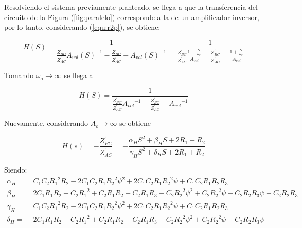 Resolviendo el sistema previamente planteado, se llega a que la transferencia del circuito de la Figura (\ref{fig:paralelo}) corresponde a la de un amplificador inversor, por lo tanto, considerando (\ref{equ:r2p}), se obtiene:

\begin{equation*}
	H(S) = \frac{1}{\frac{Z_{BC}^{'}}{Z_{AC}^{'}} {A_{vol}\left(S\right)}^{-1} - \frac{Z_{BC}^{'}}{Z_{AC}^{'}} - {A_{vol}\left(S\right)}^{-1}} = \frac{1}{\frac{Z_{BC}^{'}}{Z_{AC}^{'}} \frac{1 + \frac{S}{\omega_o}}{A_{vol}} - \frac{Z_{BC}^{'}}{Z_{AC}^{'}} - \frac{1 + \frac{S}{\omega_o}}{A_{vol}}}
	\label{equ:hsavolw}
\end{equation*}

Tomando $\omega_o \rightarrow \infty$ se llega a

\begin{equation*}
	H(S) = \frac{1}{\frac{Z_{BC}^{'}}{Z_{AC}^{'}} {A_{vol}}^{-1} - \frac{Z_{BC}^{'}}{Z_{AC}^{'}} - {A_{vol}}^{-1}}
	\label{equ:hsavol}
\end{equation*}

Nuevamente, considerando $A_o \rightarrow \infty$ se obtiene

\begin{equation}
	H(s) = -\frac{Z_{BC}^{'}}{Z_{AC}^{'}} = - \frac{\alpha_H S^{2} + \beta_H S + 2 R_{1} + R_{2}}
	{\gamma_H S^{2} + \delta_H S + 2 R_{1} + R_{2}}
	\label{equ:hs}
\end{equation}

Siendo: 
\begin{equation}
\begin{split}
	\alpha_H =\ & C_{1} C_{2} {R_{1}}^{2} R_{2} - 2 C_{1} C_{2} R_{1} {R_{2}}^{2} \psi^{2} + 2 C_{1} C_{2} R_{1} {R_{2}}^{2} \psi + C_{1} C_{2} R_{1} R_{2} R_{3}\\
	\beta_H =\ & 2 C_{1} R_{1} R_{2} + C_{2} {R_{1}}^{2} + C_{2} R_{1} R_{2} + C_{2} R_{1} R_{3} - C_{2} {R_{2}}^{2} \psi^{2} + C_{2} {R_{2}}^{2} \psi - C_{2} R_{2} R_{3} \psi + C_{2} R_{2} R_{3}\\
	\gamma_H =\ & C_{1} C_{2} {R_{1}}^{2} R_{2} - 2 C_{1} C_{2} R_{1} {R_{2}}^{2} \psi^{2} + 2 C_{1} C_{2} R_{1} {R_{2}}^{2} \psi + C_{1} C_{2} R_{1} R_{2} R_{3}\\
	\delta_H =\ & 2 C_{1} R_{1} R_{2} + C_{2} {R_{1}}^{2} + C_{2} R_{1} R_{2} + C_{2} R_{1} R_{3} - C_{2} {R_{2}}^{2} \psi^{2} + C_{2} {R_{2}}^{2} \psi + C_{2} R_{2} R_{3} \psi
\end{split}
\label{equ:general}
\end{equation}

